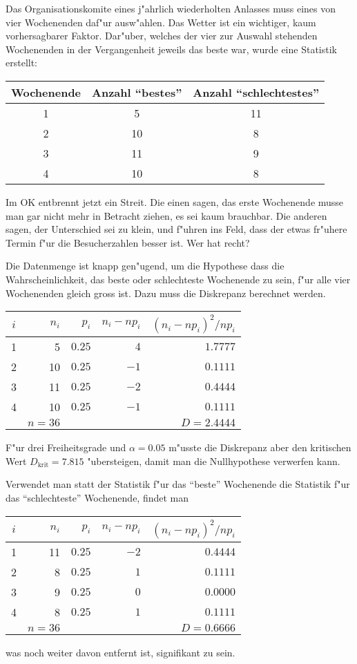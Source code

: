 Das Organisationskomite eines j"ahrlich wiederholten Anlasses muss
eines von vier Wochenenden daf"ur ausw"ahlen.
Das Wetter ist ein wichtiger, kaum vorhersagbarer Faktor.
Dar"uber, welches der vier zur Auswahl stehenden Wochenenden
in der Vergangenheit jeweils das beste war, wurde eine Statistik
erstellt:
\begin{center}
\begin{tabular}{ccc}
\hline
Wochenende&Anzahl ``bestes''&Anzahl ``schlechtestes''\\
\hline
1&5&11\\
2&10&8\\
3&11&9\\
4&10&8\\
\hline
\end{tabular}
\end{center}
Im OK entbrennt jetzt ein Streit. Die einen sagen, das erste Wochenende
musse man gar nicht mehr in Betracht ziehen, es sei kaum brauchbar.
Die anderen sagen, der Unterschied sei zu klein, und f"uhren ins Feld,
dass der etwas fr"uhere Termin f"ur die Besucherzahlen besser ist.
Wer hat recht?

\begin{loesung}
Die Datenmenge ist knapp gen"ugend, um die Hypothese
dass die Wahrscheinlichkeit, das beste oder schlechteste Wochenende zu sein,
f"ur alle vier Wochenenden gleich gross ist.
Dazu muss die Diskrepanz berechnet werden.
\begin{center}
\begin{tabular}{|crrrr|}
\hline
$i$& $n_i$& $p_i$&$n_i-np_i$&$(n_i-np_i)^2/np_i$\\
\hline
  1&     5&$0.25$&$ 4$&$1.7777$\\
  2&    10&$0.25$&$-1$&$0.1111$\\
  3&    11&$0.25$&$-2$&$0.4444$\\
  4&    10&$0.25$&$-1$&$0.1111$\\
\hline
   &$n=36$&      &      &$D=2.4444$\\
\hline
\end{tabular}
\end{center}
F"ur drei Freiheitsgrade und $\alpha=0.05$ m"usste die Diskrepanz
aber den kritischen Wert $D_{\text{krit}}=7.815$ "ubersteigen, damit
man die Nullhypothese verwerfen kann.

Verwendet man statt der Statistik f"ur das ``beste'' Wochenende
die Statistik f"ur das ``schlechteste'' Wochenende, findet man
\begin{center}
\begin{tabular}{|crrrr|}
\hline
$i$& $n_i$& $p_i$&$n_i-np_i$&$(n_i-np_i)^2/np_i$\\
\hline
  1&    11&$0.25$&$-2$&$0.4444$\\
  2&     8&$0.25$&$1$&$0.1111$\\
  3&     9&$0.25$&$0$&$0.0000$\\
  4&     8&$0.25$&$1$&$0.1111$\\
\hline
   &$n=36$&      &      &$D=0.6666$\\
\hline
\end{tabular}
\end{center}
was noch weiter davon entfernt ist, signifikant zu sein.
\end{loesung}

